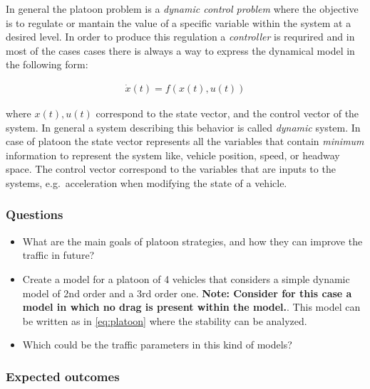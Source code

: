 \documentclass[]{book}
\providecommand{\tightlist}{%
  \setlength{\itemsep}{0pt}\setlength{\parskip}{0pt}}
\theoremstyle{definition}
\theoremstyle{definition}
\theoremstyle{definition}
\theoremstyle{remark}
\begin{document}
In general the platoon problem is a \emph{dynamic control problem} where
the objective is to regulate or mantain the value of a specific variable
within the system at a desired level. In order to produce this
regulation a \emph{controller} is requrired and in most of the cases
cases there is always a way to express the dynamical model in the
following form:

\begin{align}
\dot{x}(t) = f(x(t), u(t)) \label{eq:platoon}
\end{align}

where \(x(t), u(t)\) correspond to the state vector, and the control
vector of the system. In general a system describing this behavior is
called \emph{dynamic} system. In case of platoon the state vector
represents all the variables that contain \emph{minimum} information to
represent the system like, vehicle position, speed, or headway space.
The control vector correspond to the variables that are inputs to the
systems, e.g.~acceleration when modifying the state of a vehicle.

\hypertarget{questions-4}{%
\subsubsection*{Questions}\label{questions-4}}

\begin{itemize}
\tightlist
\item
  What are the main goals of platoon strategies, and how they can
  improve the traffic in future?
\item
  Create a model for a platoon of 4 vehicles that considers a simple
  dynamic model of 2nd order and a 3rd order one. \textbf{Note: Consider
  for this case a model in which no drag is present within the model.}.
  This model can be written as in \eqref{eq:platoon} where the stability
  can be analyzed.
\item
  Which could be the traffic parameters in this kind of models?
\end{itemize}

\hypertarget{expected-outcomes-4}{%
\subsubsection*{Expected outcomes}\label{expected-outcomes-4}}
\end{document}
